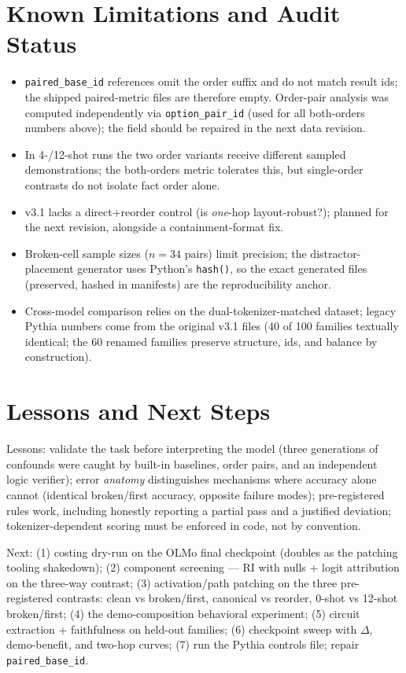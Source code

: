\documentclass[11pt,a4paper]{article}
\begin{document}
\section{Known Limitations and Audit Status}
\begin{itemize}
\item \texttt{paired\_base\_id} references omit the order suffix and do not match result ids; the shipped paired-metric files are therefore empty. Order-pair analysis was computed independently via \texttt{option\_pair\_id} (used for all both-orders numbers above); the field should be repaired in the next data revision.
\item In 4-/12-shot runs the two order variants receive different sampled demonstrations; the both-orders metric tolerates this, but single-order contrasts do not isolate fact order alone.
\item v3.1 lacks a direct+reorder control (is \emph{one}-hop layout-robust?); planned for the next revision, alongside a containment-format fix.
\item Broken-cell sample sizes ($n{=}34$ pairs) limit precision; the distractor-placement generator uses Python's \texttt{hash()}, so the exact generated files (preserved, hashed in manifests) are the reproducibility anchor.
\item Cross-model comparison relies on the dual-tokenizer-matched dataset; legacy Pythia numbers come from the original v3.1 files (40 of 100 families textually identical; the 60 renamed families preserve structure, ids, and balance by construction).
\end{itemize}

\section{Lessons and Next Steps}
Lessons: validate the task before interpreting the model (three generations of confounds were caught by built-in baselines, order pairs, and an independent logic verifier); error \emph{anatomy} distinguishes mechanisms where accuracy alone cannot (identical broken/first accuracy, opposite failure modes); pre-registered rules work, including honestly reporting a partial pass and a justified deviation; tokenizer-dependent scoring must be enforced in code, not by convention.

Next: (1) costing dry-run on the OLMo final checkpoint (doubles as the patching tooling shakedown); (2) component screening --- RI with nulls + logit attribution on the three-way contrast; (3) activation/path patching on the three pre-registered contrasts: clean vs broken/first, canonical vs reorder, 0-shot vs 12-shot broken/first; (4) the demo-composition behavioral experiment; (5) circuit extraction + faithfulness on held-out families; (6) checkpoint sweep with $\Delta$, demo-benefit, and two-hop curves; (7) run the Pythia controls file; repair \texttt{paired\_base\_id}.
\end{document}
